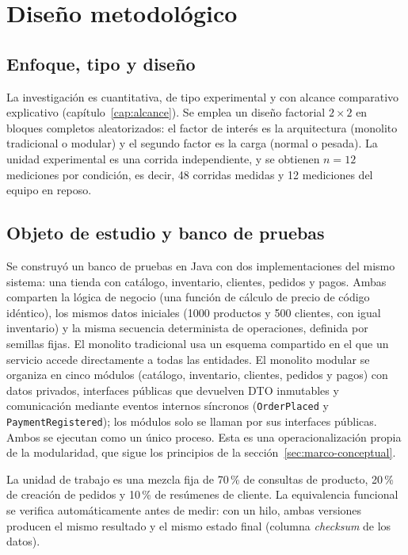 \chapter{Diseño metodológico}
\label{cap:diseno}

\section{Enfoque, tipo y diseño}

La investigación es cuantitativa, de tipo experimental y con alcance comparativo explicativo (capítulo~\ref{cap:alcance}). Se emplea un diseño factorial $2\times 2$ en bloques completos aleatorizados: el factor de interés es la arquitectura (monolito tradicional o modular) y el segundo factor es la carga (normal o pesada). La unidad experimental es una corrida independiente, y se obtienen $n = 12$ mediciones por condición, es decir, 48 corridas medidas y 12 mediciones del equipo en reposo.

\section{Objeto de estudio y banco de pruebas}
\label{sec:banco}

Se construyó un banco de pruebas en Java con dos implementaciones del mismo sistema: una tienda con catálogo, inventario, clientes, pedidos y pagos. Ambas comparten la lógica de negocio (una función de cálculo de precio de código idéntico), los mismos datos iniciales (1000 productos y 500 clientes, con igual inventario) y la misma secuencia determinista de operaciones, definida por semillas fijas. El monolito tradicional usa un esquema compartido en el que un servicio accede directamente a todas las entidades. El monolito modular se organiza en cinco módulos (catálogo, inventario, clientes, pedidos y pagos) con datos privados, interfaces públicas que devuelven DTO inmutables y comunicación mediante eventos internos síncronos (\texttt{OrderPlaced} y \texttt{PaymentRegistered}); los módulos solo se llaman por sus interfaces públicas. Ambos se ejecutan como un único proceso. Esta es una operacionalización propia de la modularidad, que sigue los principios de la sección~\ref{sec:marco-conceptual}.

La unidad de trabajo es una mezcla fija de 70\,\% de consultas de producto, 20\,\% de creación de pedidos y 10\,\% de resúmenes de cliente. La equivalencia funcional se verifica automáticamente antes de medir: con un hilo, ambas versiones producen el mismo resultado y el mismo estado final (columna \textit{checksum} de los datos).


